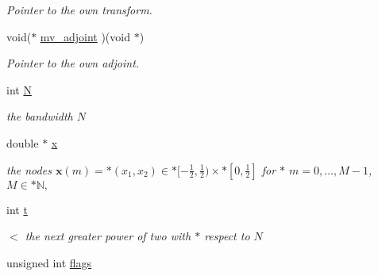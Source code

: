 \begin{CompactItemize}
\begin{CompactList}\small\item\em Pointer to the own transform. \item\end{CompactList}\item 
\hypertarget{structnfsft__plan_14cc99f56f6a61958aef26f80aac6f12}{
void($\ast$ \hyperlink{structnfsft__plan_14cc99f56f6a61958aef26f80aac6f12}{mv\_\-adjoint} )(void $\ast$)}
\label{structnfsft__plan_14cc99f56f6a61958aef26f80aac6f12}

\begin{CompactList}\small\item\em Pointer to the own adjoint. \item\end{CompactList}\item 
\hypertarget{structnfsft__plan_e5da5c37169612dcf2d66ff595ee4403}{
int \hyperlink{structnfsft__plan_e5da5c37169612dcf2d66ff595ee4403}{N}}
\label{structnfsft__plan_e5da5c37169612dcf2d66ff595ee4403}

\begin{CompactList}\small\item\em the bandwidth $N$ \item\end{CompactList}\item 
\hypertarget{structnfsft__plan_f361cee5b4f7dabae68e53674861df90}{
double $\ast$ \hyperlink{structnfsft__plan_f361cee5b4f7dabae68e53674861df90}{x}}
\label{structnfsft__plan_f361cee5b4f7dabae68e53674861df90}

\begin{CompactList}\small\item\em the nodes $\mathbf{x}(m) = * \left(x_1,x_2\right) \in * [-\frac{1}{2},\frac{1}{2}) \times * [0,\frac{1}{2}]$ for $\ast$ $m=0,\ldots,M-1$,$M \in * \mathbb{N},$ \item\end{CompactList}\item 
int \hyperlink{structnfsft__plan_59d80818cb9c0dcaccc477954720772c}{t}
\begin{CompactList}\small\item\em $<$ the next greater power of two with $\ast$ respect to $N$ \item\end{CompactList}\item 
\hypertarget{structnfsft__plan_5ad6e9d30dd23d5be94b9277e5068694}{
unsigned int \hyperlink{structnfsft__plan_5ad6e9d30dd23d5be94b9277e5068694}{flags}}
\label{structnfsft__plan_5ad6e9d30dd23d5be94b9277e5068694}


\end{CompactItemize}
